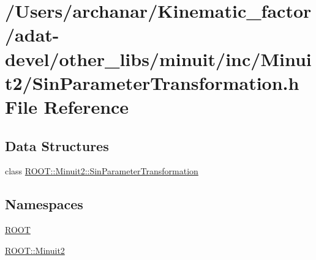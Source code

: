 \hypertarget{adat-devel_2other__libs_2minuit_2inc_2Minuit2_2SinParameterTransformation_8h}{}\section{/\+Users/archanar/\+Kinematic\+\_\+factor/adat-\/devel/other\+\_\+libs/minuit/inc/\+Minuit2/\+Sin\+Parameter\+Transformation.h File Reference}
\label{adat-devel_2other__libs_2minuit_2inc_2Minuit2_2SinParameterTransformation_8h}
\subsection*{Data Structures}
\begin{DoxyCompactItemize}
\item 
class \mbox{\hyperlink{classROOT_1_1Minuit2_1_1SinParameterTransformation}{R\+O\+O\+T\+::\+Minuit2\+::\+Sin\+Parameter\+Transformation}}
\end{DoxyCompactItemize}
\subsection*{Namespaces}
\begin{DoxyCompactItemize}
\item 
 \mbox{\hyperlink{namespaceROOT}{R\+O\+OT}}
\item 
 \mbox{\hyperlink{namespaceROOT_1_1Minuit2}{R\+O\+O\+T\+::\+Minuit2}}
\end{DoxyCompactItemize}

